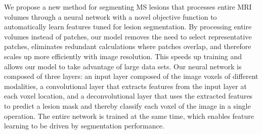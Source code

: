 We propose a new method for segmenting MS lesions that processes
entire MRI volumes through a neural network with a novel objective function to
automatically learn features tuned for lesion segmentation.
%
%
%
By processing entire volumes instead of patches, our model removes the need to
select representative patches, eliminates redundant calculations where patches
overlap, and therefore scales up more efficiently with image resolution. This
speeds up training and allows our model to take advantage of large data sets.
%
%
Our neural network is composed of three layers: an input layer composed of the
image voxels of different modalities, a convolutional layer \cite{LeCun1998}
that extracts features from the input layer at each voxel location, and a
deconvolutional layer \cite{zeiler2011} that uses the extracted features to
predict a lesion mask and thereby classify each voxel of the image in a single
operation. The entire network is trained at the same time, which enables feature
learning to be driven by segmentation performance.
%
% 
